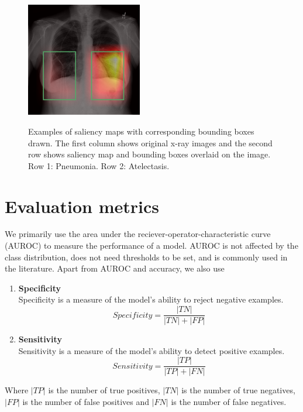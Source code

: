 \documentclass[12pt,oneside,a4paper]{report}
\begin{document}
\begin{figure}
  \includegraphics[width=0.45\textwidth]{images/atelectasis_hm_bbox}\\[0.01\textwidth]
  \caption{Examples of saliency maps with corresponding bounding boxes drawn.
    The first column shows original x-ray images and the second row shows
    saliency map and bounding boxes overlaid on the image. Row 1: Pneumonia. Row
    2: Atelectasis.}
  \label{cam_bbox_examples}
\end{figure}

\section{Evaluation metrics}
We primarily use the area under the reciever-operator-characteristic curve
(AUROC) to measure the performance of a model. AUROC is not affected by the
class distribution, does not need thresholds to be set, and is commonly used in
the literature. Apart from AUROC and accuracy, we also use

\begin{enumerate}
\item{\textbf{Specificity}\\
    Specificity is a measure of the model's ability to reject negative examples.
    \begin{equation}
      Specificity = \frac{|TN|}{|TN| + |FP|}
    \end{equation}
  }
\item{\textbf{Sensitivity}\\
    Sensitivity is a measure of the model's ability to detect positive examples.
    \begin{equation}
      Sensitivity = \frac{|TP|}{|TP| + |FN|}
    \end{equation}
  }
\end{enumerate}
Where $|TP|$ is the number of true positives, $|TN|$ is the number of true
negatives, $|FP|$ is the number of false positives and $|FN|$ is the number of
false negatives.
\end{document}
